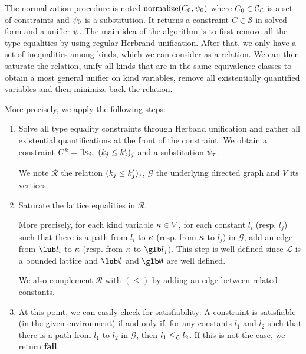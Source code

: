 The normalization procedure is noted $\operatorname{normalize}(C_0,\mathrm{\psi}_0)$ where
$C_0\in {\mathcal C_{\mathcal L}}$ is a set of constraints and $\mathrm{\psi}_0$ is a substitution.
It returns a constraint $C \in \mathcal S$ in
solved form and a unifier $\mathrm{\psi}$.
The main idea of the algorithm is to first remove all the type equalities
by using regular Herbrand unification. After that, we only have
a set of inequalities among kinds, which we can consider as a relation.
We can then saturate the relation,
unify all kinds that are in the same equivalence classes to obtain
a most general unifier on kind variables,
remove all existentially quantified variables and
then minimize back the relation.

More precisely, we apply the following steps:
\begin{enumerate}
\item Solve all type equality constraints through Herband unification and
  gather all existential quantifications at the front of the constraint.
  We obtain a constraint $C^k = \exists \kappa_i,\ (k_j \leq k'_j)_j$ and
  a substitution $\mathrm{\psi}_\tau$.
  
  We note $\mathcal R$ the relation $(k_j \leq k'_j)_j$,
  $\mathcal G$ the underlying directed graph and $V$ its vertices.

\item Saturate the lattice equalities in $\mathcal R$.
  
  More precisely, for each kind variable $\kappa \in V$,
  for each constant $l_i$ (resp. $l_j$) such that
  there is a path from $l_i$ to $\kappa$ (resp. from $\kappa$ to $l_j$) in $\mathcal G$,
  add an edge from $\lub l_i$ to $\kappa$
  (resp. from $\kappa$ to $\glb l_j$).
  This step is well defined since $\mathcal L$ is a bounded lattice
  and $\lub\emptyset$ and $\glb\emptyset$ are well defined.

  We also complement $\mathcal R$ with $(\leq)$ by adding an edge
  between related constants.
\item
  At this point, we can easily check for satisfiability: A constraint
  is satisfiable (in the given environment) if and only if,
  for any constants $l_1$ and $l_2$ such that
  there is a path from $l_1$ to $l_2$ in $\mathcal G$, then $l_1\leq_\mathcal L l_2$.
  If this is not the case, we return \textbf{fail}.
  

\end{enumerate}

